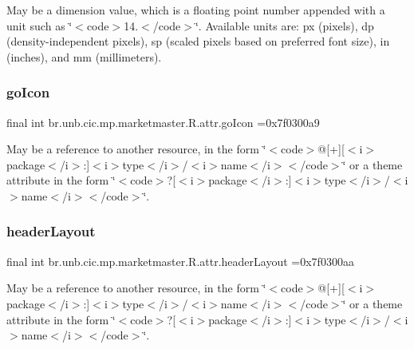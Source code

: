 May be a dimension value, which is a floating point number appended with a unit such as \char`\"{}$<$code$>$14.\+5sp$<$/code$>$\char`\"{}. Available units are\+: px (pixels), dp (density-\/independent pixels), sp (scaled pixels based on preferred font size), in (inches), and mm (millimeters). \mbox{\label{classbr_1_1unb_1_1cic_1_1mp_1_1marketmaster_1_1R_1_1attr_ac99d6c2ea32af1b73e923bdbfb9ba256}} 
\subsubsection{\texorpdfstring{go\+Icon}{goIcon}}
{\footnotesize\ttfamily final int br.\+unb.\+cic.\+mp.\+marketmaster.\+R.\+attr.\+go\+Icon =0x7f0300a9\hspace{0.3cm}{\ttfamily [static]}}

May be a reference to another resource, in the form \char`\"{}$<$code$>$@\mbox{[}+\mbox{]}\mbox{[}$<$i$>$package$<$/i$>$\+:\mbox{]}$<$i$>$type$<$/i$>$/$<$i$>$name$<$/i$>$$<$/code$>$\char`\"{} or a theme attribute in the form \char`\"{}$<$code$>$?\mbox{[}$<$i$>$package$<$/i$>$\+:\mbox{]}$<$i$>$type$<$/i$>$/$<$i$>$name$<$/i$>$$<$/code$>$\char`\"{}. \mbox{\label{classbr_1_1unb_1_1cic_1_1mp_1_1marketmaster_1_1R_1_1attr_a96c84d1b5a3f04c2d2242e17931a84ff}} 
\subsubsection{\texorpdfstring{header\+Layout}{headerLayout}}
{\footnotesize\ttfamily final int br.\+unb.\+cic.\+mp.\+marketmaster.\+R.\+attr.\+header\+Layout =0x7f0300aa\hspace{0.3cm}{\ttfamily [static]}}

May be a reference to another resource, in the form \char`\"{}$<$code$>$@\mbox{[}+\mbox{]}\mbox{[}$<$i$>$package$<$/i$>$\+:\mbox{]}$<$i$>$type$<$/i$>$/$<$i$>$name$<$/i$>$$<$/code$>$\char`\"{} or a theme attribute in the form \char`\"{}$<$code$>$?\mbox{[}$<$i$>$package$<$/i$>$\+:\mbox{]}$<$i$>$type$<$/i$>$/$<$i$>$name$<$/i$>$$<$/code$>$\char`\"{}. \mbox{\label{classbr_1_1unb_1_1cic_1_1mp_1_1marketmaster_1_1R_1_1attr_a09b8179adeda7acdaee8ae53893c7837}} 
